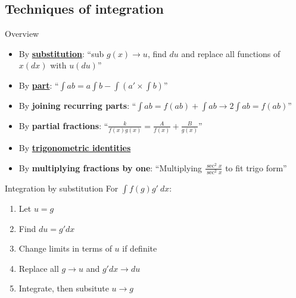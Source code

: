 \subsection{Techniques of integration}
\begin{knBox}
    {Overview}
    \begin{itemize}
        \item By \hyperref[sec:intsub]{\textbf{substitution}}: “sub $g(x)\to u$, find $du$ and replace all functions of $x(dx)$ with $u(du)$”
        \item By \hyperref[sec:intpart]{\textbf{part}}: “$\int ab=a\int b-\int (a'\times \int b)$”
        \item By \textbf{joining recurring parts}: “$\int ab=f(ab)+\int ab\to 2\int ab = f(ab)$”
        \item By \textbf{partial fractions}: “$\frac{k}{f(x)g(x)}=\frac{A}{f(x)}+\frac{B}{g(x)}$”
        \item By \hyperref[sec:inttrigo]{\textbf{trigonometric identities}}
        \item By \textbf{multiplying fractions by one}: “Multiplying $\frac{\sec^2x}{\sec^2x}$ to fit trigo form”
    \end{itemize}
\end{knBox}

\label{sec:intsub}
\begin{theorem}
    {Integration by substitution}
    For $\int f(g)g'\:dx$:
    \begin{enumerate}
        \item Let $u=g$
        \item Find $du=g'dx$
        \item Change limits in terms of $u$ if definite
        \item Replace all $g\to u$ and $g'dx\to du$
        \item Integrate, then subsitute $u\to g$
    \end{enumerate}
\end{theorem}

